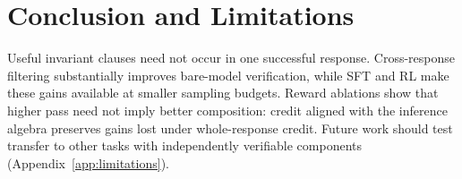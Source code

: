 \section{Conclusion and Limitations}\label{sec:conclusion}

Useful invariant clauses need not occur in one successful response.
Cross-response filtering substantially improves bare-model verification,
while SFT and RL make these gains available at smaller sampling budgets.
Reward ablations show that higher pass need not imply better composition:
credit aligned with the inference algebra preserves gains lost under
whole-response credit.  Future work should test transfer to other tasks with
independently verifiable components (Appendix~\ref{app:limitations}).
